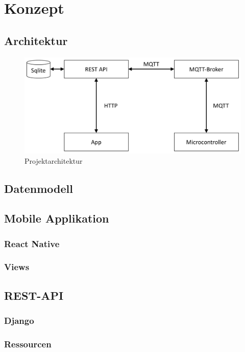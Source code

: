 \section{Konzept}

    \subsection{Architektur}
    \begin{figure}[H]
        \centering
        \includegraphics[width=0.7\linewidth]{../Pictures/Konzept/Architecture}
        \caption{Projektarchitektur}
        \label{fig:architecture}
    \end{figure}
    
    \subsection{Datenmodell}
    
    \subsection{Mobile Applikation}

        \subsubsection{React Native}
        \subsubsection{Views}

    \subsection{REST-API}

        \subsubsection{Django}
        \subsubsection{Ressourcen}
        \newcommand{\tabitem}{~~\llap{\textbullet}~~}
        
